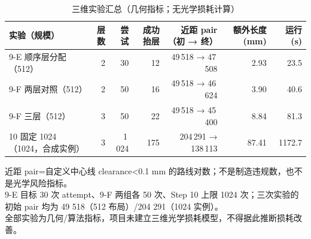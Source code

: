 \begin{table}[htbp]
  \centering
  \caption{三维实验汇总（几何指标；无光学损耗计算）}
  \label{tab:3d-experiments}
  \begin{tabular}{lrrrrrr}
    \toprule
    实验（规模） & 层数 & 尝试 & 成功抬层 & 近距 pair（初 → 终） & 额外长度 (mm) & 运行 (s) \\
    \midrule
    9-E 顺序层分配（512） & 2 & 30 & 12 & 49\,518 → 47\,508 & 2.93 & 23.5 \\
    9-F 两层对照（512） & 2 & 50 & 16 & 49\,518 → 46\,624 & 3.90 & 40.6 \\
    9-F 三层（512） & 3 & 50 & 22 & 49\,518 → 45\,400 & 8.84 & 81.3 \\
    10 固定 1024（1024，合成实例） & 3 & 1\,024 & 175 & 204\,291 → 138\,113 & 87.41 & 1172.7 \\
    \bottomrule
  \end{tabular}
  \par\vspace{2pt}
  \begin{flushleft}\footnotesize
  近距 pair=自定义中心线 clearance<0.1 mm 的路线对数；不是制造违规数，也不是光学风险指标。 \\
  9-E 目标 30 次 attempt、9-F 两组各 50 次、Step 10 上限 1024 次；三次实验的初始 pair 均为 49 518（512 布局）/204 291（1024 实例）。 \\
  全部实验为几何/算法指标，项目未建立三维光学损耗模型，不得据此推断损耗改善。 \\
  \end{flushleft}
\end{table}
